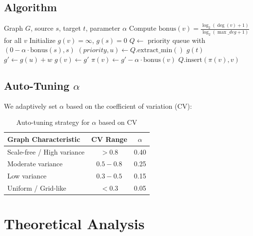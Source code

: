 \documentclass[11pt,a4paper]{article}
\begin{document}
\subsection{Algorithm}

\begin{algorithm}
\caption{DASH: Single-Source Query}
\begin{algorithmic}[1]
\REQUIRE Graph $G$, source $s$, target $t$, parameter $\alpha$
\STATE Compute $\text{bonus}(v) = \frac{\log_2(\deg(v)+1)}{\log_2(\max\_deg+1)}$ for all $v$
\STATE Initialize $g(v) = \infty$, $g(s) = 0$
\STATE $Q \leftarrow$ priority queue with $(0 - \alpha \cdot \text{bonus}(s), s)$
    \STATE $(priority, u) \leftarrow Q.\text{extract\_min}()$
        \RETURN $g(t)$
    \ENDIF
        \STATE $g' \leftarrow g(u) + w$
            \STATE $g(v) \leftarrow g'$
            \STATE $\pi(v) \leftarrow g' - \alpha \cdot \text{bonus}(v)$
            \STATE $Q.\text{insert}(\pi(v), v)$
        \ENDIF
    \ENDFOR
\ENDWHILE
\end{algorithmic}
\end{algorithm}

\subsection{Auto-Tuning $\alpha$}

We adaptively set $\alpha$ based on the coefficient of variation (CV):

\begin{table}[h]
\centering
\begin{tabular}{lcc}
\toprule
Graph Characteristic & CV Range & $\alpha$ \\
\midrule
Scale-free / High variance & $> 0.8$ & 0.40 \\
Moderate variance & $0.5 - 0.8$ & 0.25 \\
Low variance & $0.3 - 0.5$ & 0.15 \\
Uniform / Grid-like & $< 0.3$ & 0.05 \\
\bottomrule
\end{tabular}
\caption{Auto-tuning strategy for $\alpha$ based on CV}
\end{table}

\section{Theoretical Analysis}
\end{document}
